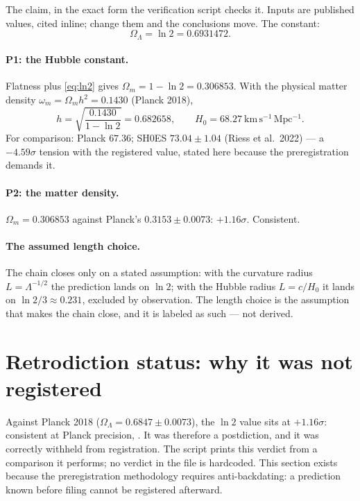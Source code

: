 \documentclass{alienfolio}
\begin{document}
The claim, in the exact form the verification script checks it.
Inputs are published values, cited inline; change them and the
conclusions move. The constant:
\begin{equation}
\Omega_{\Lambda} = \ln 2 = 0.6931472.
\label{eq:ln2}
\end{equation}

\paragraph{P1: the Hubble constant.} Flatness plus
\eqref{eq:ln2} gives $\Omega_{m} = 1 - \ln 2 = 0.306853$. With the
physical matter density $\omega_{m} = \Omega_{m}h^{2} = 0.1430$
(Planck 2018),
\begin{equation}
h = \sqrt{\frac{0.1430}{1 - \ln 2}} = 0.682658,
\qquad H_{0} = 68.27\ \mathrm{km\,s^{-1}\,Mpc^{-1}}.
\label{eq:H0}
\end{equation}
For comparison: Planck $67.36$; SH0ES $73.04 \pm 1.04$ (Riess et
al.\ 2022) --- a $-4.59\sigma$ tension with the registered value,
stated here because the preregistration demands it.

\paragraph{P2: the matter density.} $\Omega_{m} = 0.306853$ against
Planck's $0.3153 \pm 0.0073$: $+1.16\sigma$. Consistent.

\paragraph{The assumed length choice.} The chain closes only on a
stated assumption: with the curvature radius $L = \Lambda^{-1/2}$
the prediction lands on $\ln 2$; with the Hubble radius $L = c/H_{0}$
it lands on $\ln 2 / 3 \approx 0.231$, excluded by observation. The
length choice is the assumption that makes the chain close, and it
is labeled as such --- not derived.

\section{Retrodiction status: why it was not registered}
\label{sec:retrodiction}

Against Planck 2018 ($\Omega_{\Lambda} = 0.6847 \pm 0.0073$), the
$\ln 2$ value sits at $+1.16\sigma$: consistent at Planck precision,
. It was therefore a postdiction, and
it was correctly withheld from registration. The script prints this
verdict from a comparison it performs; no verdict in the file is
hardcoded. This section exists because the preregistration
methodology requires anti-backdating: a prediction known before
filing cannot be registered afterward.
\end{document}
